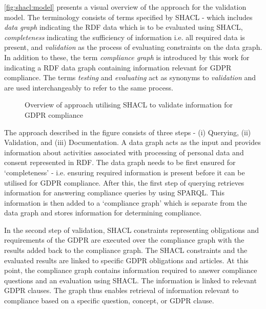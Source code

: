 \autoref{fig:shacl:model} presents a visual overview of the approach for the validation model.
The terminology consists of terms specified by SHACL - which includes 
	\textit{data graph} indicating the RDF data which is to be evaluated using SHACL,
 	\textit{completeness} indicating the sufficiency of information i.e. all required data is present, 
 	and \textit{validation} as the process of evaluating constraints on the data graph.
In addition to these, the term \textit{compliance graph} is introduced by this work for indicating a RDF data graph containing information relevant for GDPR compliance.
The terms \textit{testing} and \textit{evaluating} act as synonyms to \textit{validation} and are used interchangeably to refer to the same process.
\begin{figure}[htbp]
    \centering
    \caption{Overview of approach utilising SHACL to validate information for GDPR compliance}
    \label{fig:shacl:model}
\end{figure}

The approach described in the figure consists of three steps - (i) Querying, (ii) Validation, and (iii) Documentation. A data graph acts as the input and provides information about activities associated with processing of personal data and consent represented in RDF. The data graph needs to be first ensured for `completeness' - i.e. ensuring required information is present before it can be utilised for GDPR compliance.
After this, the first step of querying retrieves information for answering compliance queries by using SPARQL. This information is then added to a `compliance graph' which is separate from the data graph and stores information for determining compliance.

In the second step of validation, SHACL constraints representing obligations and requirements of the GDPR are executed over the compliance graph with the results added back to the compliance graph.
The SHACL constraints and the evaluated results are linked to specific GDPR obligations and articles.
At this point, the compliance graph contains information required to answer compliance questions and an evaluation using SHACL. The information is linked to relevant GDPR clauses. The graph thus enables retrieval of information relevant to compliance based on a specific question, concept, or GDPR clause.

